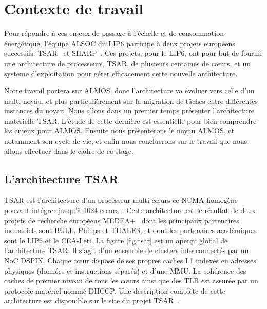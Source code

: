 \chapter{Contexte de travail}
\label{sec:context}

  Pour répondre à ces enjeux de passage à l'échelle et de consommation
  énergétique, l'équipe ALSOC du LIP6 participe à deux projets européens
  successifs: TSAR~\cite{tsar2008} et
  SHARP~\cite{sharp2012}. Ces projets, pour le LIP6,
  ont pour but de fournir une architecture de processeurs, TSAR, de plusieurs
  centaines de c\oe urs, et un système d'exploitation pour gérer efficacement
  cette nouvelle architecture.

  Notre travail portera sur ALMOS, donc l'architecture va évoluer vers celle
  d'un multi-noyau, et plus particulièrement sur la migration de tâches entre
  différentes instances du noyau. Nous allons dans un premier temps présenter
  l'architecture matérielle TSAR. L'étude de cette dernière est essentielle pour
  bien comprendre les enjeux pour ALMOS. Ensuite nous présenterons le noyau
  ALMOS, et notamment son cycle de vie, et enfin nous concluerons sur le travail
  que nous allons effectuer dans le cadre de ce stage.
  

  \section{L'architecture TSAR}
  \label{sec:tsar}

    TSAR est l'architecture d’un processeur multi-c\oe urs cc-NUMA homogène
    pouvant intégrer jusqu’à 1024 c\oe urs~\cite{greiner2009tsar}. Cette
    architecture est le résultat de deux projets de recherche européens
    MEDEA+~\cite{tsar2008,sharp2012} dont les principaux partenaires industriels
    sont BULL, Philips et THALES, et dont les partenaires académiques sont le
    LIP6 et le CEA-Leti. La figure \ref{fig:tsar} est un aperçu global de
    l'architecture TSAR. Il s'agit d'un ensemble de clusters interconnectés par
    un NoC
    DSPIN. Chaque c\oe ur dispose de ses propres caches L1 indexés en
    adresses physiques (données et instructions séparés) et d'une MMU. La
    cohérence des caches de premier niveau de tous les c\oe urs ainsi que des
    TLB est assurée par un protocole matériel nommé
    DHCCP. Une
    description complète de cette architecture est disponible sur le site du
    projet TSAR~\cite{tsar2008web}.

